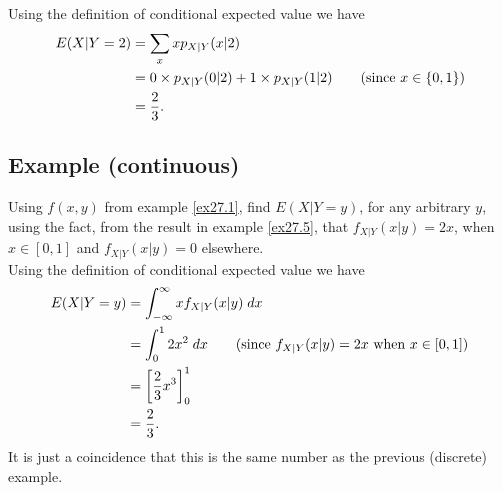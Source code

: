 \solution
Using the definition of conditional expected value we have
\begin{align*}
E(X|Y = 2) & = \sum_x xp_{X|Y}(x|2) \\
	& = 0\times p_{X|Y}(0|2) + 1\times p_{X|Y}(1|2) \tag{since $x \in \set{0,1}$} \\
	& = \frac{2}{3}.
\end{align*}
 
\subsection{Example (continuous)}
Using $f(x,y)$ from example \ref{ex27.1}, find $E(X | Y = y)$, for any arbitrary $y$, using the fact, from the result in example \ref{ex27.5}, that $f_{X|Y}(x|y) = 2x$, when $x \in [0,1]$ and $f_{X|Y}(x|y) = 0$ elsewhere.  \\
 
\solution
Using the definition of conditional expected value we have
\begin{align*}
E(X | Y = y) & = \int_{-\infty}^\infty xf_{X|Y}(x|y) \; dx \\
	& =  \int_{0}^1  2x^2 \; dx \tag{since $f_{X|Y}(x|y) = 2x$ when $x \in [0,1]$} \\
	& = \squac{\frac{2}{3}x^3}_0^1 \\
	& = \frac{2}{3}.
\end{align*}
It is just a coincidence that this is the same number as the previous (discrete) example.